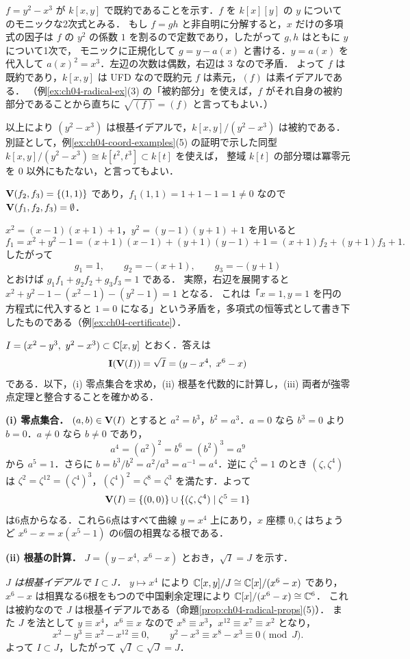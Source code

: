 $f=y^2-x^3$ が $k[x,y]$ で既約であることを示す．$f$ を $k[x][y]$ の $y$ についてのモニックな2次式とみる．
もし $f=gh$ と非自明に分解すると，$x$ だけの多項式の因子は $f$ の $y^2$ の係数 $1$ を割るので定数であり，したがって $g,h$ はともに $y$ について1次で，
モニックに正規化して $g=y-a(x)$ と書ける．$y=a(x)$ を代入して $a(x)^2=x^3$．左辺の次数は偶数，右辺は $3$ なので矛盾．
よって $f$ は既約であり，$k[x,y]$ は UFD なので既約元 $f$ は素元，$(f)$ は素イデアルである．
（例\ref{ex:ch04-radical-ex}(3) の「被約部分」を使えば，$f$ がそれ自身の被約部分であることから直ちに $\sqrt{(f)}=(f)$ と言ってもよい．）

以上により $(y^2-x^3)$ は根基イデアルで，$k[x,y]/(y^2-x^3)$ は被約である．
別証として，例\ref{ex:ch04-coord-examples}(5) の証明で示した同型 $k[x,y]/(y^2-x^3)\cong k[t^2,t^3]\subset k[t]$ を使えば，
整域 $k[t]$ の部分環は冪零元を $0$ 以外にもたない，と言ってもよい．

$\mathbf{V}(f_2,f_3)=\{(1,1)\}$ であり，$f_1(1,1)=1+1-1=1\ne0$ なので $\mathbf{V}(f_1,f_2,f_3)=\emptyset$．

$x^2=(x-1)(x+1)+1$，$y^2=(y-1)(y+1)+1$ を用いると
\[
  f_1=x^2+y^2-1=(x+1)(x-1)+(y+1)(y-1)+1=(x+1)f_2+(y+1)f_3+1 .
\]
したがって
\[
  g_1=1,\qquad g_2=-(x+1),\qquad g_3=-(y+1)
\]
とおけば $g_1f_1+g_2f_2+g_3f_3=1$ である．
実際，右辺を展開すると $x^2+y^2-1-(x^2-1)-(y^2-1)=1$ となる．
これは「$x=1,y=1$ を円の方程式に代入すると $1=0$ になる」という矛盾を，多項式の恒等式として書き下したものである（例\ref{ex:ch04-certificate}）．

$I=(x^2-y^3,\ y^2-x^3)\subset\C[x,y]$ とおく．答えは
\[
  \mathbf{I}(\mathbf{V}(I))=\sqrt I=(y-x^4,\ x^6-x)
\]
である．以下，(i) 零点集合を求め，(ii) 根基を代数的に計算し，(iii) 両者が強零点定理と整合することを確かめる．

\textbf{(i) 零点集合．}
$(a,b)\in\mathbf{V}(I)$ とすると $a^2=b^3$，$b^2=a^3$．$a=0$ なら $b^3=0$ より $b=0$．$a\ne0$ なら $b\ne0$ であり，
\[
  a^4=(a^2)^2=b^6=(b^2)^3=a^9
\]
から $a^5=1$．さらに $b=b^3/b^2=a^2/a^3=a^{-1}=a^4$．逆に $\zeta^5=1$ のとき $(\zeta,\zeta^4)$ は
$\zeta^2=\zeta^{12}=(\zeta^4)^3$，$(\zeta^4)^2=\zeta^8=\zeta^3$ を満たす．よって
\[
  \mathbf{V}(I)=\{(0,0)\}\cup\{(\zeta,\zeta^4)\mid\zeta^5=1\}
\]
は6点からなる．これら6点はすべて曲線 $y=x^4$ 上にあり，$x$ 座標 $0,\zeta$ はちょうど $x^6-x=x(x^5-1)$ の6個の相異なる根である．

\textbf{(ii) 根基の計算．}
$J=(y-x^4,\ x^6-x)$ とおき，$\sqrt I=J$ を示す．

\emph{$J$ は根基イデアルで $I\subset J$．}
$y\mapsto x^4$ により $\mathbb{C}[x,y]/J\cong\mathbb{C}[x]/(x^6-x)$ であり，$x^6-x$ は相異なる6根をもつので中国剰余定理により $\mathbb{C}[x]/(x^6-x)\cong\mathbb{C}^6$．
これは被約なので $J$ は根基イデアルである（命題\ref{prop:ch04-radical-props}(5)）．
また $J$ を法として $y\equiv x^4$，$x^6\equiv x$ なので $x^8\equiv x^3$，$x^{12}\equiv x^7\equiv x^2$ となり，
\[
  x^2-y^3\equiv x^2-x^{12}\equiv0,\qquad y^2-x^3\equiv x^8-x^3\equiv0\pmod J.
\]
よって $I\subset J$，したがって $\sqrt I\subset\sqrt J=J$．

